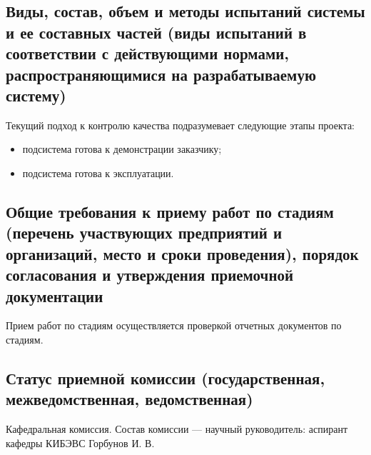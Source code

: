 \subsection{Виды, состав, объем и методы испытаний системы и ее составных частей (виды испытаний в соответствии с действующими нормами, распространяющимися на разрабатываемую систему)}

Текущий подход к контролю качества подразумевает следующие этапы проекта:
\begin{itemize}
  \item подсистема готова к демонстрации заказчику;
  \item подсистема готова к эксплуатации.
\end{itemize}

\subsection{Общие требования к приему работ по стадиям (перечень участвующих предприятий и организаций, место и сроки проведения), порядок согласования и утверждения приемочной документации}

Прием работ по стадиям осуществляется проверкой отчетных документов по стадиям.

\subsection{Статус приемной комиссии (государственная, межведомственная, ведомственная)}

Кафедральная комиссия. Состав комиссии --- научный руководитель: аспирант кафедры КИБЭВС Горбунов И. В.
